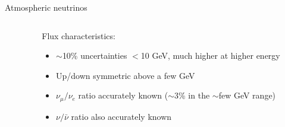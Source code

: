 \begin{frame}[t]{Atmospheric neutrinos}
\begin{columns}
\begin{column}{0.64\textwidth}
  \end{column}
  \begin{column}{0.35\textwidth}
   {\small
     Flux characteristics:
      \begin{itemize}
        \item $\sim$10\% uncertainties $<$10 GeV, much higher at higher energy
        \item Up/down symmetric above a few GeV
        \item $\nu_{\mu}/\nu_{e}$ ratio accurately known
              ($\sim$3\% in the $\sim$few GeV range)
         \item $\nu/\bar{\nu}$ ratio also accurately known
      \end{itemize}
   }
  \end{column}
\end{columns}
\end{frame}


